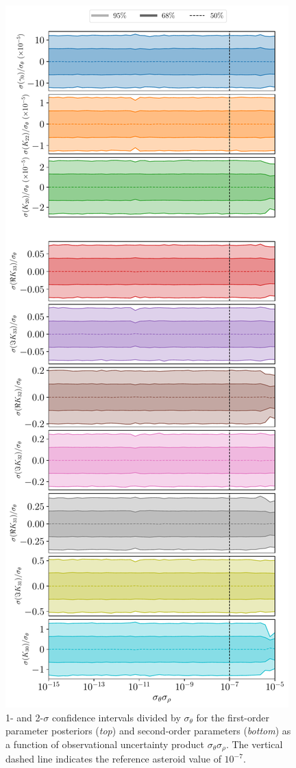 \documentclass[fleqn,usenatbib]{mnras}
\begin{document}
\begin{figure}
  \centering
  \includegraphics[height=0.89\textheight]{figs/scan-product.pdf}
  \caption{1- and 2-$\sigma$ confidence intervals divided by $\sigma_\theta$ for the first-order parameter posteriors (\textit{top}) and second-order parameters (\textit{bottom}) as a function of observational uncertainty product $\sigma_\theta \sigma_\rho$. The vertical dashed line indicates the reference asteroid value of $10^{-7}$.}
  \label{fig:scan-product}
\end{figure}
\end{document}

